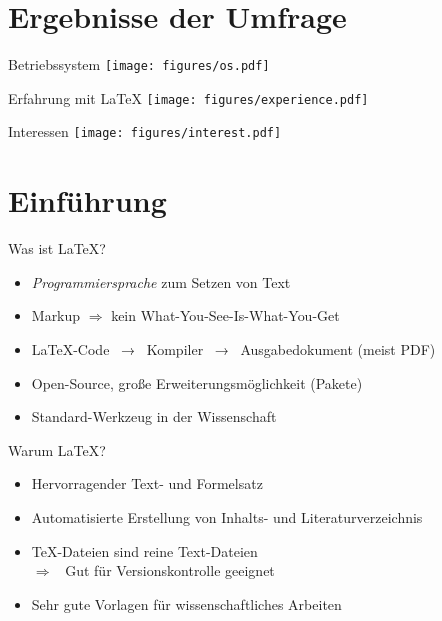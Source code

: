 \section[Umfrage]{Ergebnisse der Umfrage}

\begin{frame}{Betriebssystem}
  \centering
  \texttt{[image: figures/os.pdf]}
\end{frame}

\begin{frame}{Erfahrung mit \LaTeX}
  \centering
  \texttt{[image: figures/experience.pdf]}
\end{frame}

\begin{frame}{Interessen}
  \centering
  \texttt{[image: figures/interest.pdf]}
\end{frame}

\section{Einführung}

\begin{frame}{Was ist \LaTeX?}
  \Large
  \linespread{1.5}
  \begin{itemize}
    \item \emph{Programmiersprache} zum Setzen von Text
    \item Markup $\Rightarrow$ kein
      \textcolor{vertexDarkRed}{W}hat-\textcolor{vertexDarkRed}{Y}ou-\textcolor{vertexDarkRed}{S}ee-\textcolor{vertexDarkRed}{I}s-\textcolor{vertexDarkRed}{W}hat-\textcolor{vertexDarkRed}{Y}ou-\textcolor{vertexDarkRed}{G}et

    \item \LaTeX-Code \, → \, Kompiler \, → \, Ausgabedokument (meist PDF)
    \item Open-Source, große Erweiterungsmöglichkeit (Pakete)
    \item Standard-Werkzeug in der Wissenschaft
  \end{itemize}
  \linespread{1.0}
\end{frame}

\begin{frame}{Warum \LaTeX?}
  \Large
  \linespread{1.5}
  \begin{itemize}
    \item Hervorragender Text- und Formelsatz
    \item Automatisierte Erstellung von Inhalts- und Literaturverzeichnis
    \item \TeX-Dateien sind reine Text-Dateien \\
      $\Rightarrow$ \, Gut für Versionskontrolle geeignet
    \item Sehr gute Vorlagen für wissenschaftliches Arbeiten
  \end{itemize}
  \linespread{1.0}
\end{frame}

